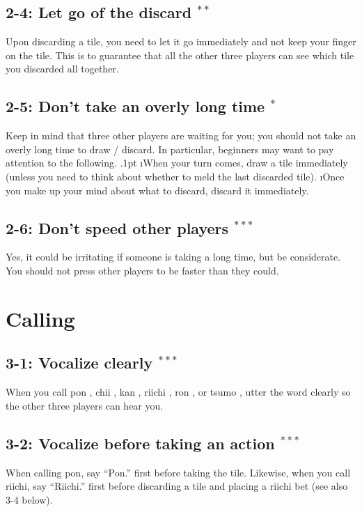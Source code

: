 \subsection*{2-4: Let go of the discard $^{**}$}
Upon discarding a tile, you need to let it go immediately and not keep your finger on the tile. This is to guarantee that all the other three players can see which tile you discarded all together.

\subsection*{2-5: Don't take an overly long time $^{*}$}
Keep in mind that three other players are waiting for you; you should not take an overly long time to draw / discard. In particular, beginners may want to pay attention to the following. 
\bi\itemsep.1pt
\i When your turn comes, draw a tile immediately (unless you need to think about whether to meld the last discarded tile). 
\i Once you make up your mind about what to discard, discard it immediately.
\ei

\subsection*{2-6: Don't speed other players $^{***}$}
Yes, it could be irritating if someone is taking a long time, but be considerate.
You should not press other players to be faster than they could.

\section{Calling}

\subsection*{3-1: Vocalize clearly $^{***}$}
When you call {\jap pon} \textipa{[p\'\textopeno\ng]}, {\jap chii} , {\jap kan} \textipa{[k\'\textturnv\ng]}, {\jap riichi} , {\jap ron} \textipa{[r\'\textopeno\ng]}, or {\jap tsumo} \textipa{[ts\'umo]}, utter the word clearly so the other three players can hear you. 

\subsection*{3-2: Vocalize before taking an action $^{***}$}
When calling {\jap pon}, say ``{\jap Pon}.'' first before taking the tile. Likewise, when you call {\jap riichi}, say ``{\jap Riichi}.'' first before discarding a tile and placing a {\jap riichi} bet (see also 3-4 below). 

